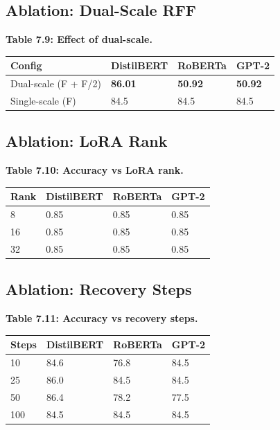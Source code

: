 \subsection{Ablation: Dual-Scale RFF}

\textbf{Table 7.9: Effect of dual-scale.}

\begin{table}[H]
\centering
\small
\begin{tabular}{llll}
\toprule
\textbf{Config} & \textbf{DistilBERT} & \textbf{RoBERTa} & \textbf{GPT-2} \\
\midrule
Dual-scale (F + F/2) & \textbf{86.01} & \textbf{50.92} & \textbf{50.92} \\
Single-scale (F) & 84.5 & 84.5 & 84.5 \\
\bottomrule
\end{tabular}
\end{table}

\subsection{Ablation: LoRA Rank}

\textbf{Table 7.10: Accuracy vs LoRA rank.}

\begin{table}[H]
\centering
\small
\begin{tabular}{llll}
\toprule
\textbf{Rank} & \textbf{DistilBERT} & \textbf{RoBERTa} & \textbf{GPT-2} \\
\midrule
8 & 0.85 & 0.85 & 0.85 \\
16 & 0.85 & 0.85 & 0.85 \\
32 & 0.85 & 0.85 & 0.85 \\
\bottomrule
\end{tabular}
\end{table}

\subsection{Ablation: Recovery Steps}

\textbf{Table 7.11: Accuracy vs recovery steps.}

\begin{table}[H]
\centering
\small
\begin{tabular}{llll}
\toprule
\textbf{Steps} & \textbf{DistilBERT} & \textbf{RoBERTa} & \textbf{GPT-2} \\
\midrule
10 & 84.6 & 76.8 & 84.5 \\
25 & 86.0 & 84.5 & 84.5 \\
50 & 86.4 & 78.2 & 77.5 \\
100 & 84.5 & 84.5 & 84.5 \\
\bottomrule
\end{tabular}
\end{table}

